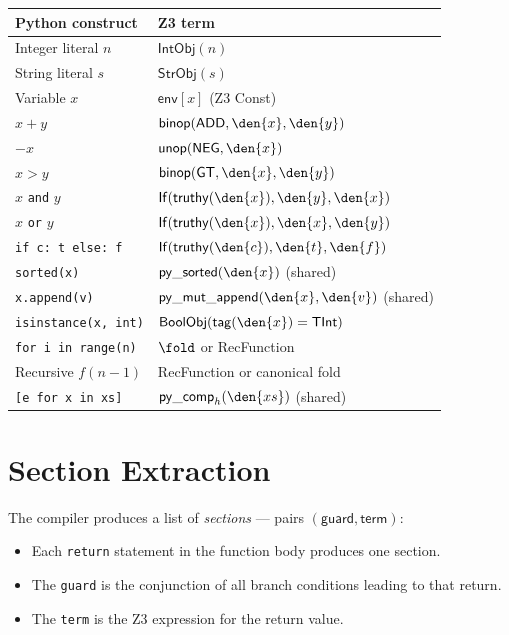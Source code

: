 \begin{center}
\small
\begin{tabular}{l l}
  \textbf{Python construct} & \textbf{Z3 term} \\
  \hline
  Integer literal $n$ & $\mathsf{IntObj}(n)$ \\
  String literal $s$ & $\mathsf{StrObj}(s)$ \\
  Variable $x$ & $\mathsf{env}[x]$ (Z3 Const) \\
  $x + y$ & $\mathsf{binop}(\mathsf{ADD}, \den{x}, \den{y})$ \\
  $-x$ & $\mathsf{unop}(\mathsf{NEG}, \den{x})$ \\
  $x > y$ & $\mathsf{binop}(\mathsf{GT}, \den{x}, \den{y})$ \\
  $x$ \texttt{and} $y$ & $\mathsf{If}(\mathsf{truthy}(\den{x}), \den{y}, \den{x})$ \\
  $x$ \texttt{or} $y$ & $\mathsf{If}(\mathsf{truthy}(\den{x}), \den{x}, \den{y})$ \\
  \texttt{if c: t else: f} & $\mathsf{If}(\mathsf{truthy}(\den{c}), \den{t}, \den{f})$ \\
  \texttt{sorted(x)} & $\mathsf{py\_sorted}(\den{x})$ (shared) \\
  \texttt{x.append(v)} & $\mathsf{py\_mut\_append}(\den{x}, \den{v})$ (shared) \\
  \texttt{isinstance(x, int)} & $\mathsf{BoolObj}(\mathsf{tag}(\den{x}) = \mathsf{TInt})$ \\
  \texttt{for i in range(n)} & $\fold$ or RecFunction \\
  Recursive $f(n-1)$ & RecFunction or canonical fold \\
  \texttt{[e for x in xs]} & $\mathsf{py\_comp}_h(\den{xs})$ (shared) \\
\end{tabular}
\end{center}

\section{Section Extraction}

The compiler produces a list of \emph{sections} --- pairs
$(\mathsf{guard}, \mathsf{term})$:

\begin{itemize}
  \item Each \texttt{return} statement in the function body produces
    one section.
  \item The \texttt{guard} is the conjunction of all branch conditions
    leading to that return.
  \item The \texttt{term} is the Z3 expression for the return value.
\end{itemize}

